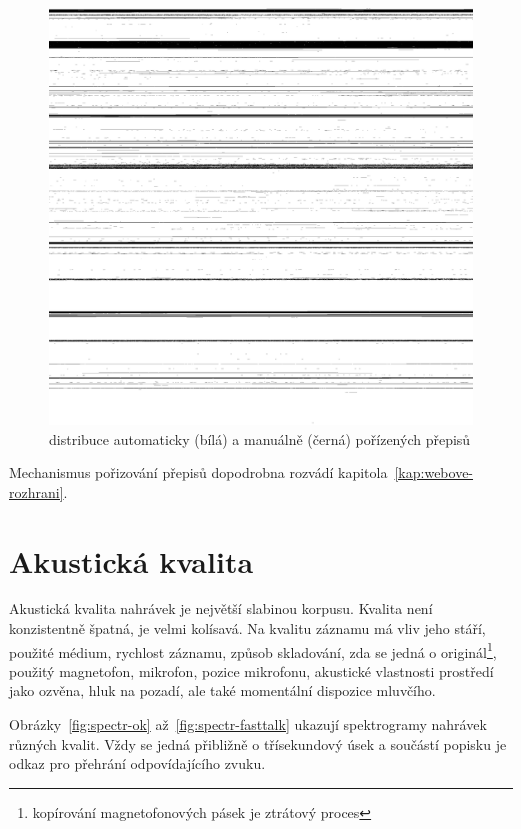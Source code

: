 \begin{figure}[htpb]
\includegraphics[scale=0.137]{rc/humbits.png}
\caption{distribuce automaticky (bílá) a manuálně (černá) pořízených přepisů}
\label{fig:humbits}
\end{figure}

Mechanismus pořizování přepisů dopodrobna rozvádí kapitola~\ref{kap:webove-rozhrani}. 

\section{Akustická kvalita}

Akustická kvalita nahrávek je největší slabinou korpusu. Kvalita není
konzistentně špatná, je velmi kolísavá. Na kvalitu záznamu má vliv jeho stáří,
použité médium, rychlost záznamu, způsob skladování, zda se jedná o
originál\footnote{kopírování magnetofonových pásek je ztrátový proces}, použitý
magnetofon, mikrofon, pozice mikrofonu, akustické vlastnosti prostředí jako
ozvěna, hluk na pozadí, ale také momentální dispozice mluvčího.

Obrázky~\ref{fig:spectr-ok} až~\ref{fig:spectr-fasttalk} ukazují spektrogramy
nahrávek různých kvalit. Vždy se jedná přibližně o třísekundový úsek a součástí
popisku je odkaz pro přehrání odpovídajícího zvuku.

